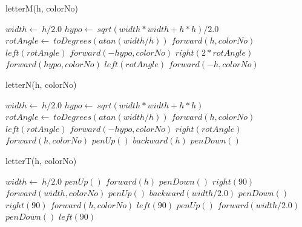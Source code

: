 \documentclass[a4paper,10pt]{article}
\begin{document}
\begin{algorithm}
\caption{letterM(h, colorNo)}
\begin{algorithmic}[5]

\STATE {}
\STATE {}
  \STATE \(width\gets\ h/2.0\)
  \STATE \(hypo\gets\ sqrt(width*width+h*h)/2.0\)
  \STATE \(rotAngle\gets\ toDegrees(atan(width/h))\)
  \STATE \(forward(h,colorNo)\)
  \STATE \(left(rotAngle)\)
  \STATE \(forward(-hypo,colorNo)\)
  \STATE \(right(2*rotAngle)\)
  \STATE \(forward(hypo,colorNo)\)
  \STATE \(left(rotAngle)\)
  \STATE \(forward(-h,colorNo)\)

\end{algorithmic}
\end{algorithm}


\begin{algorithm}
\caption{letterN(h, colorNo)}
\begin{algorithmic}[5]

\STATE {}
\STATE {}
  \STATE \(width\gets\ h/2.0\)
  \STATE \(hypo\gets\ sqrt(width*width+h*h)\)
  \STATE \(rotAngle\gets\ toDegrees(atan(width/h))\)
  \STATE \(forward(h,colorNo)\)
  \STATE \(left(rotAngle)\)
  \STATE \(forward(-hypo,colorNo)\)
  \STATE \(right(rotAngle)\)
  \STATE \(forward(h,colorNo)\)
  \STATE \(penUp()\)
  \STATE \(backward(h)\)
  \STATE \(penDown()\)

\end{algorithmic}
\end{algorithm}


\begin{algorithm}
\caption{letterT(h, colorNo)}
\begin{algorithmic}[5]

\STATE {}
\STATE {}
  \STATE \(width\gets\ h/2.0\)
  \STATE \(penUp()\)
  \STATE \(forward(h)\)
  \STATE \(penDown()\)
  \STATE \(right(90)\)
  \STATE \(forward(width,colorNo)\)
  \STATE \(penUp()\)
  \STATE \(backward(width/2.0)\)
  \STATE \(penDown()\)
  \STATE \(right(90)\)
  \STATE \(forward(h,colorNo)\)
  \STATE \(left(90)\)
  \STATE \(penUp()\)
  \STATE \(forward(width/2.0)\)
  \STATE \(penDown()\)
  \STATE \(left(90)\)

\end{algorithmic}
\end{algorithm}
\end{document}
